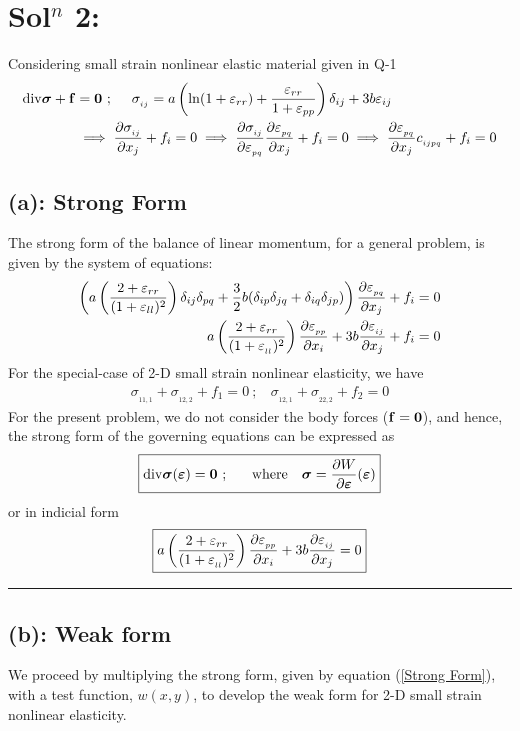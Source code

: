 \section*{Sol$^n$ 2: }
Considering small strain nonlinear elastic material given in Q-1
\begin{align*}
{\rm div} {\bm\sigma}+{\bf f} 
& ={\bf 0}\ ; \ \ \ \ \sigma_{_{ij}} = a\left( 
\ln (1+\varepsilon_{rr}) + \frac{\varepsilon_{rr}}{1+\varepsilon_{pp}}
\right)\delta_{ij}
+3b\varepsilon_{ij}\\
& \implies \frac{\partial {\sigma_{_{ij}}}}{\partial {x_j}}+f_i = 0 \implies \frac{\partial {\sigma_{_{ij}}}}{\partial {\varepsilon_{_{pq}}}}\frac{\partial {\varepsilon_{_{pq}}}}{\partial {x_j}}+f_i = 0 \implies \frac{\partial {\varepsilon_{_{pq}}}}{\partial {x_j}}c_{_{ijpq}} + f_i = 0
\end{align*}
\subsection*{(a): Strong Form}
The strong form of the balance of linear momentum, for a general problem, is given by the system of equations: 
\begin{align*}
\left( a\left(
\frac{2+\varepsilon_{rr}}{(1+\varepsilon_{ll})^2}
\right)\delta_{ij}\delta_{pq}
+\frac{3}{2}b(\delta_{ip}\delta_{jq}+\delta_{iq}\delta_{jp})\right)
\frac{\partial {\varepsilon_{_{pq}}}}{\partial {x_j}}+f_i = 0 \\ 
a\left(
\frac{2+\varepsilon_{rr}}{(1+\varepsilon_{_{ll}})^2}
\right)\frac{\partial {\varepsilon_{_{pp}}}}{\partial {x_i}}
+ 
3b\frac{\partial {\varepsilon_{_{ij}}}}{\partial {x_j}} + f_i = 0
\end{align*}
For the special-case of 2-D small strain nonlinear elasticity, we have
\begin{align}
\sigma_{_{11,1}} + \sigma_{_{12,2}} + f_1 = 0\ ; \ \ \ \ 
\sigma_{_{12,1}} + \sigma_{_{22,2}} + f_2 = 0
\label{Strong Form}
\end{align}
For the present problem, we do not consider the body forces ($\bf f = 0$), and hence, the strong form of the governing equations can be expressed as
\begin{align*}
\boxed{{\rm div}{\bm\sigma}({\bm\varepsilon}) = {\bf 0}\ ; \ \ \ \ \ \text{where}\ \ \  {\bm\sigma} = \del{W}{\bm\varepsilon}({\bm\varepsilon})}
\end{align*}
or in indicial form
\begin{align*}
\boxed{a\left(
\frac{2+\varepsilon_{rr}}{(1+\varepsilon_{_{ll}})^2}
\right)\frac{\partial {\varepsilon_{_{pp}}}}{\partial {x_i}}
+ 
3b\frac{\partial {\varepsilon_{_{ij}}}}{\partial {x_j}} = 0}
\end{align*}\hrule
\subsection*{(b): Weak form }
We proceed by multiplying the strong form, given by equation (\ref{Strong Form}), with a test function, $w(x,y)$, to develop the weak form for 2-D small strain nonlinear elasticity. 
